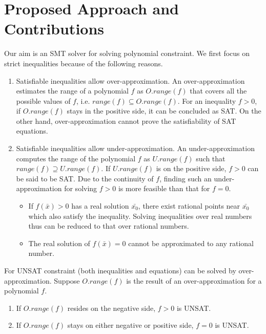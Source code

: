 \section{Proposed Approach and Contributions}
Our aim is an SMT solver for solving polynomial constraint. We first focus on strict inequalities because of the following reasons.
\begin{enumerate}
\item
Satisfiable inequalities allow over-approximation. An over-approximation estimates the range of a polynomial $f$ as $O.range(f)$ that covers all the possible values of $f$, i.e. $range(f) \subseteq O.range(f)$. For an inequality $f>0$, if $O.range(f)$ stays in the positive side, it can be concluded as SAT. On the other hand, over-approximation cannot prove the satisfiability of SAT equations.
\item
Satisfiable inequalities allow under-approximation. An under-approximation computes the range of the polynomial $f$ as  $U.range(f)$ such that $range(f) \supseteq U.range(f)$. If $U.range(f)$ is on the positive side, $f > 0$ can be said to be SAT. Due to the continuity of $f$, finding such an under-approximation for solving $f > 0$ is more feasible than that for $f = 0$.
\begin{itemize}
\item If $f(\bar{x}) > 0$ has a real solution $\bar{x_0}$, there exist rational points near $\bar{x_0}$ which also satisfy the inequality. Solving inequalities over real numbers thus can be reduced to that over rational numbers.
\item The real solution of $f(\bar{x}) = 0$ cannot be approximated to any rational number.
\end{itemize}
\end{enumerate}
For UNSAT constraint (both inequalities and equations) can be solved by over-approximation. Suppose $O.range(f)$ is the result of an over-approximation for a polynomial $f$.
\begin{enumerate}
\item If $O.range(f)$ resides on the negative side, $f > 0$ is UNSAT.
\item If $O.range(f)$ stays on either negative or positive side, $f = 0$ is UNSAT.
\end{enumerate}


